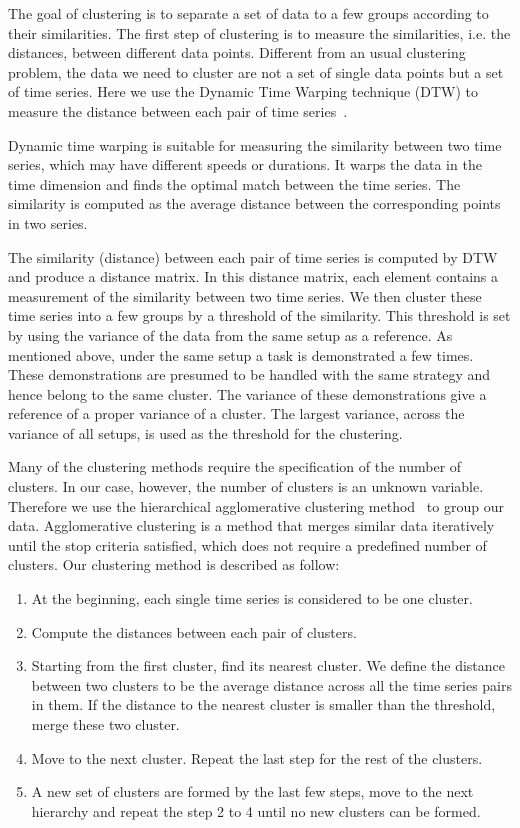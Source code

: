 The goal of clustering is to separate a set of data to a few groups according to their similarities. The first step of clustering is to measure the similarities, i.e. the distances, between different data points. Different from an usual clustering problem, the data we need to cluster are not a set of single data points but a set of time series. Here we use the Dynamic Time Warping technique (DTW) to measure the distance between each pair of time series~\cite{berndt1994using}.

Dynamic time warping is suitable for measuring the similarity between two time series, which may have different speeds or durations. It warps the data in the time dimension and finds the optimal match between the time series. The similarity is computed as the average distance between the corresponding points in two series.

The similarity (distance) between each pair of time series is computed by DTW and produce a distance matrix. In this distance matrix, each element contains a measurement of the similarity between two time series. We then cluster these time series into a few groups by a threshold of the similarity. This threshold is set by using the variance of the data from the same setup as a reference. As mentioned above, under the same setup a task is demonstrated a few times. These demonstrations are presumed to be handled with the same strategy and hence belong to the same cluster. The variance of these demonstrations give a reference of a proper variance of a cluster. The largest variance, across the variance of all setups, is used as the threshold for the clustering.

Many of the clustering methods require the specification of the number of clusters. In our case, however, the number of clusters is an unknown variable. Therefore we use the hierarchical agglomerative clustering method~\cite{willett1988recent} to group our data. Agglomerative clustering is a method that merges similar data iteratively until the stop criteria satisfied, which does not require a predefined number of clusters. Our clustering method is described as follow:

\begin{enumerate}
\item At the beginning, each single time series is considered to be one cluster.
\item Compute the distances between each pair of clusters.
\item Starting from the first cluster, find its nearest cluster. We define the distance between two clusters to be the average distance across all the time series pairs in them. If the distance to the nearest cluster is smaller than the threshold, merge these two cluster.
\item Move to the next cluster. Repeat the last step for the rest of the clusters.
\item A new set of clusters are formed by the last few steps, move to the next hierarchy and repeat the step 2 to 4 until no new clusters can be formed.
\end{enumerate}

